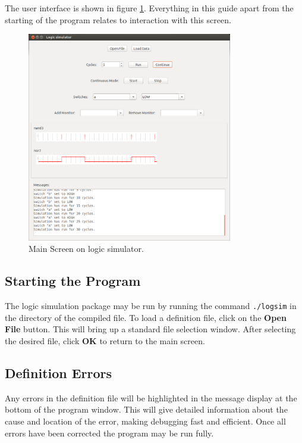 \documentclass[a4paper,10pt]{article}  %
\begin{document}
The user interface is shown in figure \ref{fig:ugimage}. Everything in
this guide apart from the starting of the program relates to
interaction with this screen.
\begin{figure}[!htb]
  \begin{center}
    \includegraphics[width=0.8\textwidth]{GUI_Screenshot.png}
  \end{center}
  \caption{Main Screen on logic simulator.}
  \label{fig:ugimage}
\end{figure}

\subsection*{Starting the Program}

The logic simulation package may be run by running the command
\texttt{./logsim} in the directory of the compiled file. To load a
definition file, click on the \textbf{Open File} button. This will
bring up a standard file selection window. After selecting the desired
file, click \textbf{OK} to return to the main screen.

\subsection*{Definition Errors}

Any errors in the definition file will be highlighted in the message
display at the bottom of the program window. This will give detailed
information about the cause and location of the error, making
debugging fast and efficient. Once all errors have been corrected the
program may be run fully.
\end{document}

